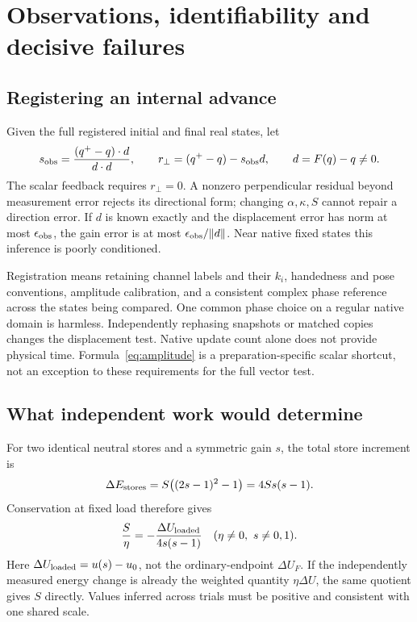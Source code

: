 \section{Observations, identifiability and decisive failures}\label{sec:observation}
\subsection{Registering an internal advance}
Given the full registered initial and final real states, let
\begin{equation}
 s_{\rm obs}=\frac{(q^+-q)\cdot d}{d\cdot d},\qquad
 r_\perp=(q^+-q)-s_{\rm obs}d,\qquad d=F(q)-q\ne0.
 \label{eq:projection}
\end{equation}
The scalar feedback requires \(r_\perp=0\). A nonzero perpendicular residual beyond measurement error rejects its directional form; changing \(\alpha,\kappa,S\) cannot repair a direction error. If \(d\) is known exactly and the displacement error has norm at most \(\epsilon_{\rm obs}\), the gain error is at most \(\epsilon_{\rm obs}/\|d\|\). Near native fixed states this inference is poorly conditioned.

Registration means retaining channel labels and their \(k_i\), handedness and pose conventions, amplitude calibration, and a consistent complex phase reference across the states being compared. One common phase choice on a regular native domain is harmless. Independently rephasing snapshots or matched copies changes the displacement test. Native update count alone does not provide physical time. Formula~\eqref{eq:amplitude} is a preparation-specific scalar shortcut, not an exception to these requirements for the full vector test.

\subsection{What independent work would determine}
For two identical neutral stores and a symmetric gain \(s\), the total store increment is
\[
 \Delta E_{\rm stores}
 =S\big((2s-1)^2-1\big)=4Ss(s-1).
\]
Conservation at fixed load therefore gives
\begin{equation}
 \frac{S}{\eta}=-\frac{\Delta U_{\rm loaded}}{4s(s-1)}
 \quad(\eta\ne0,\ s\ne0,1).
 \label{eq:energy-scale}
\end{equation}
Here \(\Delta U_{\rm loaded}=u(s)-u_0\), not the ordinary-endpoint \(\Delta U_F\). If the independently measured energy change is already the weighted quantity \(\eta\Delta U\), the same quotient gives \(S\) directly. Values inferred across trials must be positive and consistent with one shared scale.

